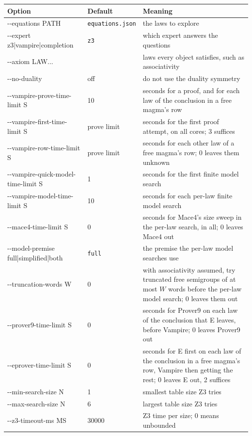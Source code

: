 \documentclass[11pt,a4paper]{article}
\theoremstyle{definition}
\theoremstyle{remark}
\newcommand{\code}[1]{\texttt{#1}}
\begin{document}
\begin{table}[ht]
\centering
\small
\begin{tabularx}{\textwidth}{@{}>{\ttfamily}l l X@{}}
\toprule
\normalfont Option & Default & Meaning \\
\midrule
-{}-equations PATH & \code{equations.json} & the laws to explore \\
-{}-expert z3|vampire|completion & \code{z3} & which expert answers the questions \\
-{}-axiom LAW... & & laws every object satisfies, such as associativity \\
-{}-no-duality & off & do not use the duality symmetry \\
-{}-vampire-prove-time-limit S & 10 & seconds for a proof, and for each law of the conclusion in a free magma's row \\
-{}-vampire-first-time-limit S & prove limit & seconds for the first proof attempt, on all cores; 3 suffices \\
-{}-vampire-row-time-limit S & prove limit & seconds for each other law of a free magma's row; $0$ leaves them unknown \\
-{}-vampire-quick-model-time-limit S & 1 & seconds for the first finite model search \\
-{}-vampire-model-time-limit S & 10 & seconds for each per-law finite model search \\
-{}-mace4-time-limit S & 0 & seconds for Mace4's size sweep in the per-law search, in all; $0$ leaves Mace4 out \\
-{}-model-premise full|simplified|both & \code{full} & the premise the per-law model searches use \\
-{}-truncation-words W & 0 & with associativity assumed, try truncated free semigroups of at most $W$ words before the per-law model search; $0$ leaves them out \\
-{}-prover9-time-limit S & 0 & seconds for Prover9 on each law of the conclusion that E leaves, before Vampire; $0$ leaves Prover9 out \\
-{}-eprover-time-limit S & 0 & seconds for E first on each law of the conclusion in a free magma's row, Vampire then getting the rest; $0$ leaves E out, 2 suffices \\
-{}-min-search-size N & 1 & smallest table size Z3 tries \\
-{}-max-search-size N & 6 & largest table size Z3 tries \\
-{}-z3-timeout-ms MS & 30000 & Z3 time per size; $0$ means unbounded \\

\end{tabularx}
\end{table}
\end{document}
